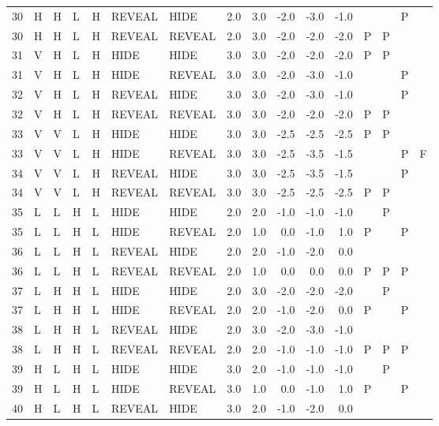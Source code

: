 \begin{longtable}{lllllllrrrrrllll}
  30 & H & H & L & H & REVEAL & HIDE & 2.0 & 3.0 & -2.0 & -3.0 & -1.0 &  &  & P &  \\ 
  30 & H & H & L & H & REVEAL & REVEAL & 2.0 & 3.0 & -2.0 & -2.0 & -2.0 & P & P &  &  \\ 
  31 & V & H & L & H & HIDE & HIDE & 3.0 & 3.0 & -2.0 & -2.0 & -2.0 & P & P &  &  \\ 
  31 & V & H & L & H & HIDE & REVEAL & 3.0 & 3.0 & -2.0 & -3.0 & -1.0 &  &  & P &  \\ 
  32 & V & H & L & H & REVEAL & HIDE & 3.0 & 3.0 & -2.0 & -3.0 & -1.0 &  &  & P &  \\ 
  32 & V & H & L & H & REVEAL & REVEAL & 3.0 & 3.0 & -2.0 & -2.0 & -2.0 & P & P &  &  \\ 
  33 & V & V & L & H & HIDE & HIDE & 3.0 & 3.0 & -2.5 & -2.5 & -2.5 & P & P &  &  \\ 
  33 & V & V & L & H & HIDE & REVEAL & 3.0 & 3.0 & -2.5 & -3.5 & -1.5 &  &  & P & F \\ 
  34 & V & V & L & H & REVEAL & HIDE & 3.0 & 3.0 & -2.5 & -3.5 & -1.5 &  &  & P &  \\ 
  34 & V & V & L & H & REVEAL & REVEAL & 3.0 & 3.0 & -2.5 & -2.5 & -2.5 & P & P &  &  \\ 
  35 & L & L & H & L & HIDE & HIDE & 2.0 & 2.0 & -1.0 & -1.0 & -1.0 &  & P &  &  \\ 
  35 & L & L & H & L & HIDE & REVEAL & 2.0 & 1.0 & 0.0 & -1.0 & 1.0 & P &  & P &  \\ 
  36 & L & L & H & L & REVEAL & HIDE & 2.0 & 2.0 & -1.0 & -2.0 & 0.0 &  &  &  &  \\ 
  36 & L & L & H & L & REVEAL & REVEAL & 2.0 & 1.0 & 0.0 & 0.0 & 0.0 & P & P & P &  \\ 
  37 & L & H & H & L & HIDE & HIDE & 2.0 & 3.0 & -2.0 & -2.0 & -2.0 &  & P &  &  \\ 
  37 & L & H & H & L & HIDE & REVEAL & 2.0 & 2.0 & -1.0 & -2.0 & 0.0 & P &  & P &  \\ 
  38 & L & H & H & L & REVEAL & HIDE & 2.0 & 3.0 & -2.0 & -3.0 & -1.0 &  &  &  &  \\ 
  38 & L & H & H & L & REVEAL & REVEAL & 2.0 & 2.0 & -1.0 & -1.0 & -1.0 & P & P & P &  \\ 
  39 & H & L & H & L & HIDE & HIDE & 3.0 & 2.0 & -1.0 & -1.0 & -1.0 &  & P &  &  \\ 
  39 & H & L & H & L & HIDE & REVEAL & 3.0 & 1.0 & 0.0 & -1.0 & 1.0 & P &  & P &  \\ 
  40 & H & L & H & L & REVEAL & HIDE & 3.0 & 2.0 & -1.0 & -2.0 & 0.0 &  &  &  &  \\ 

\end{longtable}
